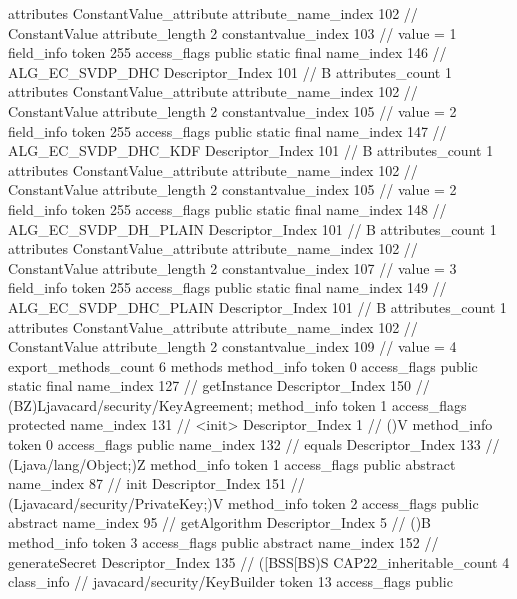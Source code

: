 {{{{{				attributes {
				ConstantValue_attribute {
					attribute_name_index	102		// ConstantValue
					attribute_length	2
					constantvalue_index	103		// value = 1
				}
				}
			}
			field_info {
				token	255
				access_flags	public static final
				name_index	146		// ALG_EC_SVDP_DHC
				Descriptor_Index	101		// B
				attributes_count	1
				attributes {
				ConstantValue_attribute {
					attribute_name_index	102		// ConstantValue
					attribute_length	2
					constantvalue_index	105		// value = 2
				}
				}
			}
			field_info {
				token	255
				access_flags	public static final
				name_index	147		// ALG_EC_SVDP_DHC_KDF
				Descriptor_Index	101		// B
				attributes_count	1
				attributes {
				ConstantValue_attribute {
					attribute_name_index	102		// ConstantValue
					attribute_length	2
					constantvalue_index	105		// value = 2
				}
				}
			}
			field_info {
				token	255
				access_flags	public static final
				name_index	148		// ALG_EC_SVDP_DH_PLAIN
				Descriptor_Index	101		// B
				attributes_count	1
				attributes {
				ConstantValue_attribute {
					attribute_name_index	102		// ConstantValue
					attribute_length	2
					constantvalue_index	107		// value = 3
				}
				}
			}
			field_info {
				token	255
				access_flags	public static final
				name_index	149		// ALG_EC_SVDP_DHC_PLAIN
				Descriptor_Index	101		// B
				attributes_count	1
				attributes {
				ConstantValue_attribute {
					attribute_name_index	102		// ConstantValue
					attribute_length	2
					constantvalue_index	109		// value = 4
				}
				}
			}
			}
			export_methods_count	6
			methods {
				method_info {
					token	0
					access_flags	public static final
					name_index	127		// getInstance
					Descriptor_Index	150		// (BZ)Ljavacard/security/KeyAgreement;
				}
				method_info {
					token	1
					access_flags	protected
					name_index	131		// <init>
					Descriptor_Index	1		// ()V
				}
				method_info {
					token	0
					access_flags	public
					name_index	132		// equals
					Descriptor_Index	133		// (Ljava/lang/Object;)Z
				}
				method_info {
					token	1
					access_flags	public abstract
					name_index	87		// init
					Descriptor_Index	151		// (Ljavacard/security/PrivateKey;)V
				}
				method_info {
					token	2
					access_flags	public abstract
					name_index	95		// getAlgorithm
					Descriptor_Index	5		// ()B
				}
				method_info {
					token	3
					access_flags	public abstract
					name_index	152		// generateSecret
					Descriptor_Index	135		// ([BSS[BS)S
				}
			}
			CAP22_inheritable_count	4
		}
		class_info {		// javacard/security/KeyBuilder
			token	13
			access_flags	public
}}}
